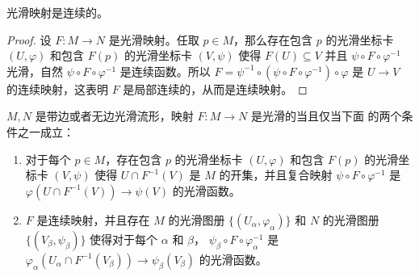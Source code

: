 \documentclass[fontset=none]{Notes}
\begin{document}
\begin{proposition}
  光滑映射是连续的。
\end{proposition}
\begin{proof}
  设 $F:M\to N$ 是光滑映射。任取 $p\in M$，那么存在包含 $p$ 的光滑坐标卡
  $(U,\varphi)$ 和包含 $F(p)$ 的光滑坐标卡 $(V,\psi)$ 使得 $F(U)\subseteq V$
  并且 $\psi\circ F\circ\varphi^{-1}$ 光滑，自然 $\psi\circ F\circ\varphi^{-1}$
  是连续函数。所以 $F=\psi^{-1}\circ(\psi\circ F\circ\varphi^{-1})\circ\varphi$
  是 $U\to V$ 的连续映射，这表明 $F$ 是局部连续的，从而是连续映射。
\end{proof}

\begin{proposition}[光滑性的等价刻画]
  $M,N$ 是带边或者无边光滑流形，映射 $F:M\to N$ 是光滑的当且仅当下面
  的两个条件之一成立：
  \begin{enumerate}
    \item 对于每个 $p\in M$，存在包含 $p$ 的光滑坐标卡 $(U,\varphi)$
    和包含 $F(p)$ 的光滑坐标卡 $(V,\psi)$ 使得 $U\cap F^{-1}(V)$
    是 $M$ 的开集，并且复合映射 $\psi\circ F\circ\varphi^{-1}$
    是 $\varphi(U\cap F^{-1}(V))\to \psi(V)$ 的光滑函数。
    \item $F$ 是连续映射，并且存在 $M$ 的光滑图册 $\{(U_\alpha,\varphi_\alpha)\}$
    和 $N$ 的光滑图册 $\{(V_\beta,\psi_\beta)\}$ 使得对于每个 $\alpha$ 和 $\beta$，
    $\psi_\beta\circ F\circ\varphi_\alpha^{-1}$ 是
    $\varphi_\alpha(U_\alpha\cap F^{-1}(V_\beta))\to\psi_\beta(V_\beta)$
    的光滑函数。
  \end{enumerate}
\end{proposition}
\end{document}
